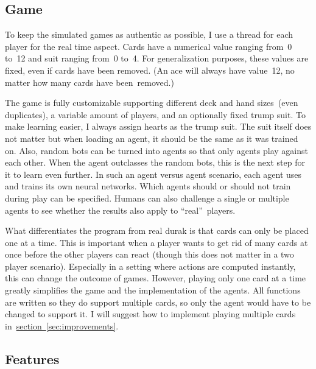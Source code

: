 \documentclass[a4paper,titlepage]{article}
\begin{document}
\subsection{Game}
\label{sec:game}

To keep the simulated games as authentic as possible, I use a thread for each player for the real time aspect. Cards have a numerical value ranging from~0 to~12 and suit ranging from~0 to~4. For generalization purposes, these values are fixed, even if cards have been removed. (An ace will always have value~12, no matter how many cards have been~removed.)

The game is fully customizable supporting different deck and hand sizes~(even duplicates), a variable amount of players, and an optionally fixed trump suit. To make learning easier, I always assign hearts as the trump suit. The suit itself does not matter but when loading an agent, it should be the same as it was trained on. Also, random bots can be turned into agents so that only agents play against each other. When the agent outclasses the random bots, this is the next step for it to learn even further. In such an agent versus agent scenario, each agent uses and trains its own neural networks. Which agents should or should not train during play can be specified.
Humans can also challenge a single or multiple agents to see whether the results also apply to ``real''~players.

What differentiates the program from real durak is that cards can only be placed one at a time. This is important when a player wants to get rid of many cards at once before the other players can react (though this does not matter in a two player scenario). Especially in a setting where actions are computed instantly, this can change the outcome of games. However, playing only one card at a time greatly simplifies the game and the implementation of the agents. All functions are written so they do support multiple cards, so only the agent would have to be changed to support it. I will suggest how to implement playing multiple cards in~\hyperref[sec:improvements]{section~\ref*{sec:improvements}}.

\subsection{Features}
\end{document}
